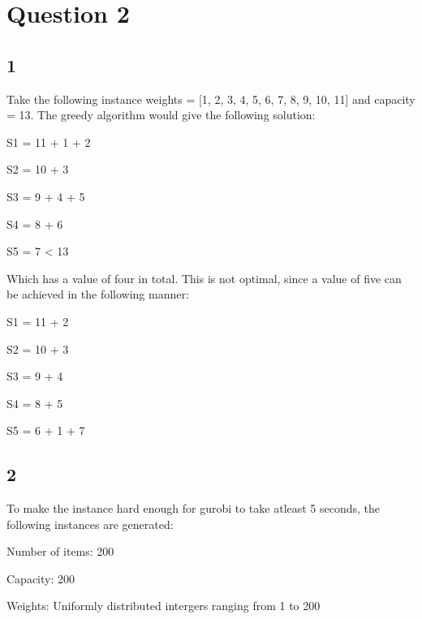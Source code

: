 \section*{Question 2}
\subsection*{1}
Take the following instance weights = [1, 2, 3, 4, 5, 6, 7, 8, 9, 10, 11] and capacity = 13. The greedy algorithm would give the following solution:
\begin{description}
	\item S1 = 11 + 1 + 2
	\item S2 = 10 + 3
	\item S3 = 9 + 4 + 5
	\item S4 = 8 + 6
	\item S5 = 7 < 13
\end{description}
Which has a value of four in total. This is not optimal, since a value of five can be achieved in the following manner:
\begin{description}
	\item S1 = 11 + 2
	\item S2 = 10 + 3
	\item S3 = 9 + 4
	\item S4 = 8 + 5
	\item S5 = 6 + 1 + 7
\end{description}
\subsection*{2}
To make the instance hard enough for gurobi to take atleast 5 seconds, the following instances are generated:
\begin{description}
	\item Number of items: 200
	\item Capacity: 200
	\item Weights: Uniformly distributed intergers ranging from 1 to 200
\end{description}
